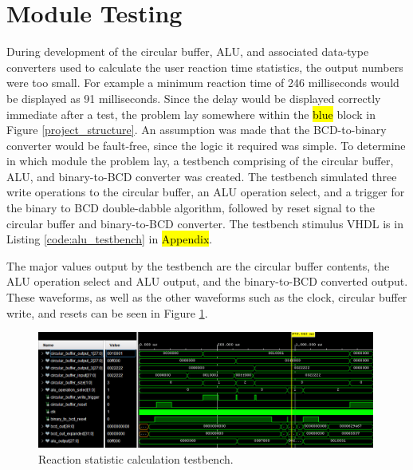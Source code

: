 \documentclass[11pt]{article}
\begin{document}
\newpage

\section{Module Testing}


During development of the circular buffer, ALU, and associated data-type converters used to calculate the user reaction time statistics, the output numbers were too small. For example a minimum reaction time of 246 milliseconds would be displayed as 91 milliseconds. Since the delay would be displayed correctly immediate after a test, the problem lay somewhere within the \hl{blue} block in Figure \ref{project_structure}. An assumption was made that the BCD-to-binary converter would be fault-free, since the logic it required was simple. To determine in which module the problem lay, a testbench comprising of the circular buffer, ALU, and binary-to-BCD converter was created. The testbench simulated three write operations to the circular buffer, an ALU operation select, and a trigger for the binary to BCD double-dabble algorithm, followed by reset signal to the circular buffer and binary-to-BCD converter. The testbench stimulus VHDL is in Listing \ref{code:alu_testbench} in \hl{Appendix}.

The major values output by the testbench are the circular buffer contents, the ALU operation select and ALU output, and the binary-to-BCD converted output. These waveforms, as well as the other waveforms such as the clock, circular buffer write, and resets can be seen in Figure \ref{fig:alu_testbench}.

\begin{figure}[H]
  \centering
  \includegraphics[width=0.99\textwidth]{WhatsApp Image 2025-05-07 at 11.33.07.jpeg}
  \caption{Reaction statistic calculation testbench.}
  \label{fig:alu_testbench}
\end{figure}
\end{document}
